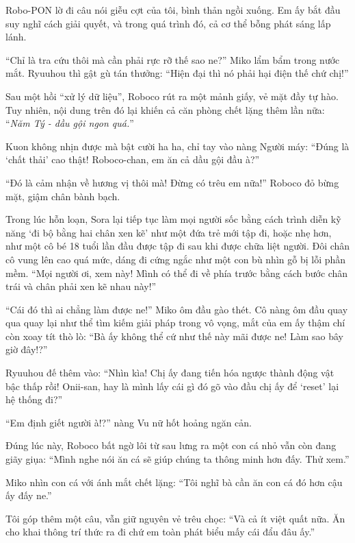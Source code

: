 \documentclass[../main.tex]{subfiles}
\begin{document}
Robo-PON lờ đi câu nói giễu cợt của tôi, bình thản ngồi xuống. Em ấy bắt đầu suy nghĩ cách giải quyết, và trong quá trình đó, cả cơ thể bỗng phát sáng lấp lánh.


``Chỉ là tra cứu thôi mà cần phải rực rỡ thế sao ne?'' Miko lẩm bẩm trong nước mắt. Ryuuhou thì gật gù tán thưởng: ``Hiện đại thì nó phải hại điện thế chứ chị!''

Sau một hồi ``xử lý dữ liệu'', Roboco rút ra một mảnh giấy, vẻ mặt đầy tự hào. Tuy nhiên, nội dung trên đó lại khiến cả căn phòng chết lặng thêm lần nữa: ``\textit{Năm Tý - dầu gội ngon quá.}''


Kuon không nhịn được mà bật cười ha ha, chỉ tay vào nàng Người máy: ``Đúng là `chất thải' cao thật! Roboco-chan, em ăn cả dầu gội đầu à?''

``Đó là cảm nhận về hương vị thôi mà! Đừng có trêu em nữa!'' Roboco đỏ bừng mặt, giậm chân bành bạch.

Trong lúc hỗn loạn, Sora lại tiếp tục làm mọi người sốc bằng cách trình diễn kỹ năng `đi bộ bằng hai chân xen kẽ' như một đứa trẻ mới tập đi, hoặc nhẹ hơn, như một cô bé 18 tuổi lần đầu được tập đi sau khi được chữa liệt người. Đôi chân cô vung lên cao quá mức, dáng đi cứng ngắc như một con bù nhìn gỗ bị lỗi phần mềm. ``Mọi người ơi, xem này! Mình có thể đi về phía trước bằng cách bước chân trái và chân phải xen kẽ nhau này!''

``Cái đó thì ai chẳng làm được ne!'' Miko ôm đầu gào thét. Cô nàng ôm đầu quay qua quay lại như thể tìm kiếm giải pháp trong vô vọng, mắt của em ấy thậm chí còn xoay tít thò lò: ``Bà ấy không thể cứ như thế này mãi được ne! Làm sao bây giờ đây!?''

Ryuuhou đế thêm vào: ``Nhìn kìa! Chị ấy đang tiến hóa ngược thành động vật bậc thấp rồi! Onii-san, hay là mình lấy cái gì đó gõ vào đầu chị ấy để `reset' lại hệ thống đi?''

``Em định giết người à!?'' nàng Vu nữ hốt hoảng ngăn cản.

Đúng lúc này, Roboco bất ngờ lôi từ sau lưng ra một con cá nhỏ vẫn còn đang giãy giụa: ``Mình nghe nói ăn cá sẽ giúp chúng ta thông minh hơn đấy. Thử xem.''

Miko nhìn con cá với ánh mắt chết lặng: ``Tôi nghĩ bà cần ăn con cá đó hơn cậu ấy đấy ne.''

Tôi góp thêm một câu, vẫn giữ nguyên vẻ trêu chọc: ``Và cả ít việt quất nữa. Ăn cho khai thông trí thức ra đi chứ em toàn phát biểu mấy cái đẩu đâu ấy.''
\end{document}
